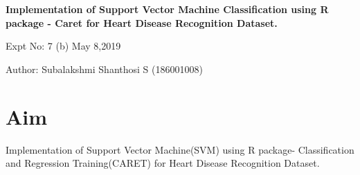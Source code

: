 \documentclass[a4paper,10pt]{article}
\begin{document}
\setcounter{secnumdepth}{-1} 
\begin{center}
\textbf{\LARGE  Implementation of Support Vector Machine Classification using R package - Caret for Heart Disease Recognition Dataset.}
\end{center}

\raggedright Expt No: 7 (b) \hfill \raggedleft May 8,2019 \\ 

\raggedright Author: Subalakshmi Shanthosi S (186001008) \par 

\noindent\makebox[\linewidth]{\rule{\textwidth}{1pt}} 

\section{Aim}
Implementation of Support Vector Machine(SVM) using R package- Classification and Regression Training(CARET) for Heart Disease Recognition Dataset.
\end{document}
